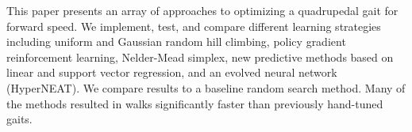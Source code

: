 
This paper presents an array of approaches to optimizing a quadrupedal
gait for forward speed.  We implement, test, and compare different
learning strategies including uniform and Gaussian random hill
climbing, policy gradient reinforcement learning,
Nelder-Mead simplex, new predictive methods based on linear
and support vector regression, and an evolved neural network
(HyperNEAT).  We compare results to a baseline random
search method.  Many of the methods resulted in walks significantly
faster than previously hand-tuned gaits.


